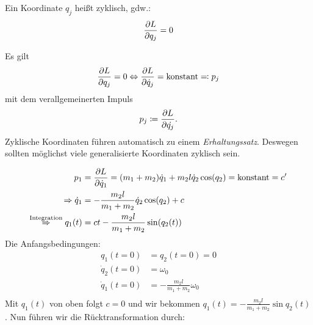\begin{definition*}\label{zyklische_koordinate}
    Ein Koordinate $q_j$ heißt zyklisch, gdw.:
    \[ \frac{\partial L}{\partial q_j} = 0 \]

    Es gilt
	\[
		\frac{\partial L}{\partial q_j} = 0 \Leftrightarrow \frac{\partial L}{\partial \dot{q}_j} = \text{konstant} \eqqcolon p_j
	\]
	mit dem verallgemeinerten Impuls 
	\[
		p_j \coloneqq \frac{\partial L}{\partial \dot{q_j}}
		\text{.}
	\]
	Zyklische Koordinaten führen automatisch zu einem \textit{Erhaltungssatz}. Deswegen sollten möglichst viele generalisierte Koordinaten zyklisch sein.
\end{definition*}

\begin{beispiel*}
	\begin{align*}
		p_1 &= \frac{\partial L}{\partial \dot{q}_1} = (m_1 + m_2)\dot{q}_1 + m_2 l \dot{q}_2 \cos(q_2) = \text{konstant} = c'\\
		\Rightarrow \dot{q}_1 &= - \frac{m_2 l}{m_1 + m_2} \dot{q}_2 \cos(q_2) + c\\
		\overset{\text{Integration}}{\Rightarrow} q_1(t) &= ct - \frac{m_2 l}{m_1 + m_2} \sin (q_2(t))
	\end{align*}
	Die Anfangsbedingungen:
	\begin{align*}
		q_1(t = 0) &= q_2(t = 0) = 0 \\
		\dot{q}_2(t=0) &= \omega_0 \\
		\dot{q}_1(t=0) &= - \frac{m_2 l}{m_1 + m_2} \omega_0 \\
	\end{align*}
	Mit $q_1(t)$ von oben folgt $c = 0$ und wir bekommen $q_1(t) = - \frac{m_2 l}{m_1 + m_2} \sin q_2(t)$. Nun führen wir die Rücktransformation durch:


\end{beispiel*}
